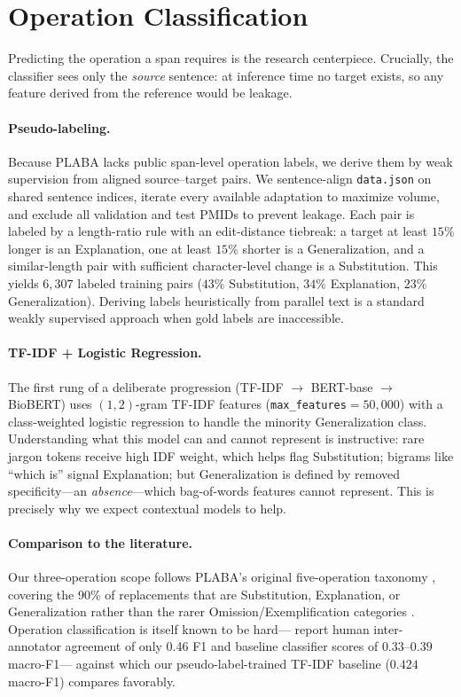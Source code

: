 \documentclass[11pt]{article}
\begin{document}
\section{Operation Classification}
\label{sec:classifier}

Predicting the operation a span requires is the research centerpiece. Crucially,
the classifier sees only the \emph{source} sentence: at inference time no target
exists, so any feature derived from the reference would be leakage.

\paragraph{Pseudo-labeling.} Because PLABA lacks public span-level operation
labels, we derive them by weak supervision from aligned source--target pairs. We
sentence-align \texttt{data.json} on shared sentence indices, iterate every
available adaptation to maximize volume, and exclude all validation and test
PMIDs to prevent leakage. Each pair is labeled by a length-ratio rule with an
edit-distance tiebreak: a target at least $15\%$ longer is an Explanation, one at
least $15\%$ shorter is a Generalization, and a similar-length pair with
sufficient character-level change is a Substitution. This yields $6{,}307$
labeled training pairs ($43\%$ Substitution, $34\%$ Explanation, $23\%$
Generalization). Deriving labels heuristically from parallel text is a standard
weakly supervised approach when gold labels are inaccessible.

\paragraph{TF-IDF + Logistic Regression.} The first rung of a deliberate
progression (TF-IDF $\rightarrow$ BERT-base $\rightarrow$ BioBERT) uses
$(1,2)$-gram TF-IDF features (\texttt{max\_features}${=}50{,}000$) with a
class-weighted logistic regression to handle the minority Generalization class.
Understanding what this model can and cannot represent is instructive: rare
jargon tokens receive high IDF weight, which helps flag Substitution; bigrams
like ``which is'' signal Explanation; but Generalization is defined by removed
specificity---an \emph{absence}---which bag-of-words features cannot represent.
This is precisely why we expect contextual models to help.

\paragraph{Comparison to the literature.} Our three-operation scope
follows PLABA's original five-operation taxonomy \citep{attal2023plaba},
covering the 90\% of replacements that are Substitution, Explanation, or
Generalization rather than the rarer Omission/Exemplification categories
\citep{ondov2025lessons}. Operation classification is itself known to be
hard---\citet{ondov2025lessons} report human inter-annotator agreement of
only 0.46 F1 and baseline classifier scores of $0.33$--$0.39$ macro-F1---
against which our pseudo-label-trained TF-IDF baseline ($0.424$ macro-F1)
compares favorably.
\end{document}
